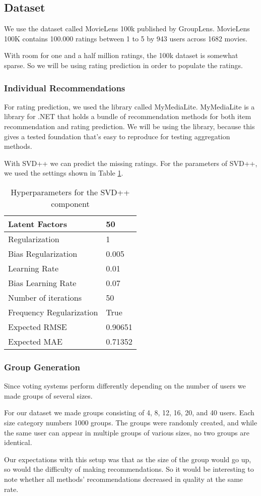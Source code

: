 \subsection{Dataset}\label{sec:dataset}
We use the dataset called MovieLens 100k published by GroupLens\cite{movielens100k}. MovieLens 100K contains 100.000 ratings between 1 to 5 by 943 users across 1682 movies.

With room for one and a half million ratings, the 100k dataset is somewhat sparse. So we will be using rating prediction in order to populate the ratings.

\subsubsection{Individual Recommendations}
For rating prediction, we used the library called MyMediaLite\cite{mymedialite}. MyMediaLite is a library for .NET that holds a bundle of recommendation methods for both item recommendation and rating prediction. We will be using the library, because this gives a tested foundation that's easy to reproduce for testing aggregation methods.

With SVD++ we can predict the missing ratings. For the parameters of SVD++, we used the settings shown in Table \ref{tbl:svdpp}.

\begin{table}[H]
	\centering
	\begin{tabular}{|l|l|}\hline
		Latent Factors & 50 \\\hline
		Regularization & 1	\\
		Bias Regularization & 0.005	\\
		Learning Rate & 0.01 \\
		Bias Learning Rate & 0.07 \\ 
		Number of iterations & 50 \\
		Frequency Regularization & True \\ 
		Expected RMSE & 0.90651 \\
		Expected MAE & 0.71352 \\ \hline
	\end{tabular}
	\caption{Hyperparameters for the SVD++ component}
	\label{tbl:svdpp}
\end{table}

\subsubsection{Group Generation}
Since voting systems perform differently depending on the number of users we made groups of several sizes.

For our dataset we made groups consisting of 4, 8, 12, 16, 20, and 40 users. Each size category numbers 1000 groups. The groups were randomly created, and while the same user can appear in multiple groups of various sizes, no two groups are identical.

Our expectations with this setup was that as the size of the group would go up, so would the difficulty of making recommendations. So it would be interesting to note whether all methods' recommendations decreased in quality at the same rate.